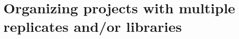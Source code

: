 \documentclass[10pt]{article}
\newcommand{\prog}[1]{\texttt{#1}}
\newcommand{\fn}[1]{\texttt{#1}}
\newcommand{\lit}[1]{\texttt{#1}}
\begin{document}
{{\begin{enumerate}
\end{enumerate}





\section{Organizing projects with multiple replicates and/or libraries}
\label{sec:organ-datas-with}

}}
\end{document}
